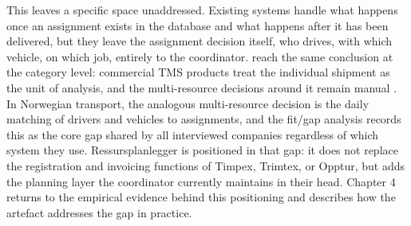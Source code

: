 This leaves a specific space unaddressed. Existing systems handle what happens once an assignment exists in the database and what happens after it has been delivered, but they leave the assignment decision itself, who drives, with which vehicle, on which job, entirely to the coordinator. \textcite{griffis2007tms} reach the same conclusion at the category level: commercial TMS products treat the individual shipment as the unit of analysis, and the multi-resource decisions around it remain manual \parencite[p.~27]{griffis2007tms}. In Norwegian transport, the analogous multi-resource decision is the daily matching of drivers and vehicles to assignments, and the fit/gap analysis records this as the core gap shared by all interviewed companies regardless of which system they use. Ressursplanlegger is positioned in that gap: it does not replace the registration and invoicing functions of Timpex, Trimtex, or Opptur, but adds the planning layer the coordinator currently maintains in their head. Chapter 4 returns to the empirical evidence behind this positioning and describes how the artefact addresses the gap in practice.